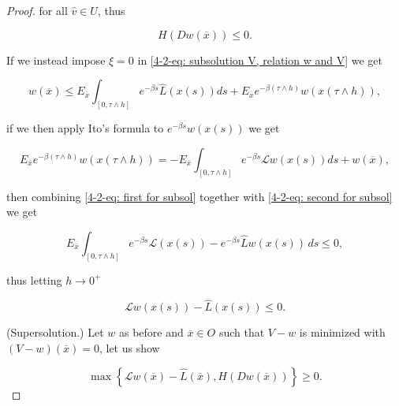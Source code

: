 \begin{theorem}
\begin{proof}
        for all $\hat{v}\in U$, thus

        \[H(Dw(\overline{x}))\leq 0.\]

        If we instead impose $\xi=0$ in \eqref{4-2-eq: subsolution V, relation w and V} we get
        
        \begin{equation}\label{4-2-eq: first for subsol}
            w(\overline{x}) \leq E_{\overline{x}} \int_{[0,\tau\land h]} e^{-\beta s}\hat{L}(x(s))ds + E_{\overline{x}}e^{-\beta(\tau\land h)}w(x(\tau\land h)),
        \end{equation}    
        
        if we then apply Ito's formula to $e^{-\beta s}w(x(s))$ we get 

        \begin{equation}\label{4-2-eq: second for subsol}
            E_{\overline{x}}e^{-\beta(\tau\land h)}w(x(\tau\land h)) = - E_{\overline{x}} \int_{[0,\tau\land h]} e^{-\beta s}\mathcal{L}w(x(s))ds + w(\overline{x}),
        \end{equation}

        then combining \eqref{4-2-eq: first for subsol} together with \eqref{4-2-eq: second for subsol} we get

        \begin{equation}
            E_{\overline{x}} \int_{[0,\tau\land h]} e^{-\beta s}\mathcal{L}(x(s)) - e^{-\beta s}\hat{L}w(x(s))\,ds\leq 0,  
        \end{equation}

        thus letting $h\to0^+$

        \begin{equation}
            \mathcal{L}w(x(s)) - \hat{L}(x(s))\leq 0.
        \end{equation}

        (Supersolution.) Let $w$ as before and $\overline{x}\in O$ such that $V-w$ is minimized with $(V-w)(\overline{x})=0$, let us show

        \begin{equation}
            \max\left\{\mathcal{L}w(\overline{x}) - \hat{L}(\overline{x}), H(Dw(\overline{x}))\right\} \geq 0.
        \end{equation}
    \end{proof}
\end{theorem}